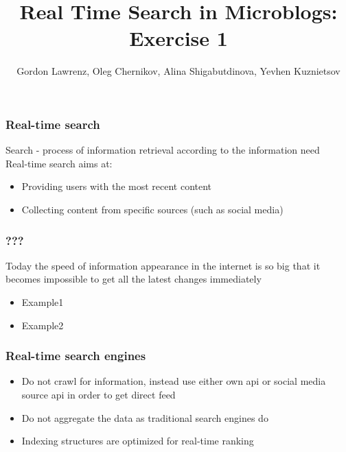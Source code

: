 \documentclass[11pt]{beamer}
\author{Gordon Lawrenz, Oleg Chernikov, Alina Shigabutdinova, Yevhen Kuznietsov}
\title[Exercise 1]{Real Time Search in Microblogs: Exercise 1}
\institute{RWTH Aachen}
\begin{document}
	
	\begin{frame}
	\titlepage
	\end{frame}
	
	
	\begin{frame}
		\tableofcontents
	\end{frame}
	
	
	\begin{frame}
		\frametitle{Real-time search}
        Search - process of information retrieval according to the information need\\
Real-time search aims at:
		\begin{itemize}
			\item
				Providing users with the most recent content
            \item
            	Collecting content from specific sources (such as social media)
		\end{itemize}
	\end{frame}
	
	
	\begin{frame}
		\frametitle{???}
        Today the speed of information appearance in the internet is so big that it becomes 		impossible to get all the latest changes immediately
		\begin{itemize}
			\item
				Example1
            \item
            	Example2
		\end{itemize}
	\end{frame}
	
	
    \begin{frame}
		\frametitle{Real-time search engines}
		\begin{itemize}
			\item
				Do not crawl for information, instead use either own api or social media source api in order to get direct feed
            \item
            	Do not aggregate the data as traditional search engines do
            \item
            	Indexing structures are optimized for real-time ranking
		\end{itemize}
	\end{frame}
	
\end{document}
